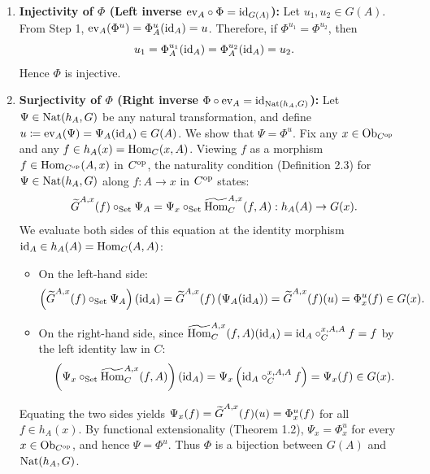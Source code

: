 \documentclass[10pt,a4paper]{article}
\begin{document}
\begin{enumerate}
\item \textbf{Injectivity of $\Phi$ (Left inverse $\mathrm{ev}_A \circ \Phi = {\textrm{id}}_{G(A)}$):}
Let $u_1, u_2 \in G(A)$. From Step 1, $\mathrm{ev}_A(\Phi^u) = \Phi^u_A({\textrm{id}}_A) = u$. Therefore, if $\Phi^{u_1} = \Phi^{u_2}$, then
$$u_1 = \Phi^{u_1}_A({\textrm{id}}_A) = \Phi^{u_2}_A({\textrm{id}}_A) = u_2.$$
Hence $\Phi$ is injective.

\item \textbf{Surjectivity of $\Phi$ (Right inverse $\Phi \circ \mathrm{ev}_A = {\textrm{id}}_{{\textrm{Nat}}(h_A,G)}$):}
Let $\Psi \in {\textrm{Nat}}(h_A, G)$ be any natural transformation, and define $u \coloneqq \mathrm{ev}_A(\Psi) = \Psi_A({\textrm{id}}_A) \in G(A)$. We show that $\Psi = \Phi^u$.
Fix any $x \in {\textrm{Ob}}_{C^{\textrm{op}}}$ and any $f \in h_A(x) = {\textrm{Hom}}_C(x,A)$. Viewing $f$ as a morphism $f \in {\textrm{Hom}}_{C^{\textrm{op}}}(A,x)$ in $C^{\textrm{op}}$, the naturality condition (Definition 2.3) for $\Psi \in {\textrm{Nat}}(h_A, G)$ along $f : A \to x$ in $C^{\textrm{op}}$ states:
$${\widetilde{G}\textrm{}}^{A,x}(f) \circ_{\textrm{Set}} \Psi_A = \Psi_x \circ_{\textrm{Set}} {\widetilde{{\textrm{Hom}}}\textrm{}}_C^{A,x}(f,A) : h_A(A) \to G(x).$$
We evaluate both sides of this equation at the identity morphism ${\textrm{id}}_A \in h_A(A) = {\textrm{Hom}}_C(A,A)$:
\begin{itemize}
\item On the left-hand side:
$$\left({\widetilde{G}\textrm{}}^{A,x}(f) \circ_{\textrm{Set}} \Psi_A\right)({\textrm{id}}_A) = {\widetilde{G}\textrm{}}^{A,x}(f)\left(\Psi_A({\textrm{id}}_A)\right) = {\widetilde{G}\textrm{}}^{A,x}(f)(u) = \Phi^u_x(f) \in G(x).$$
\item On the right-hand side, since ${\widetilde{{\textrm{Hom}}}\textrm{}}_C^{A,x}(f,A)({\textrm{id}}_A) = {\textrm{id}}_A \circ_C^{x,A,A} f = f$ by the left identity law in $C$:
$$\left(\Psi_x \circ_{\textrm{Set}} {\widetilde{{\textrm{Hom}}}\textrm{}}_C^{A,x}(f,A)\right)({\textrm{id}}_A) = \Psi_x\left({\textrm{id}}_A \circ_C^{x,A,A} f\right) = \Psi_x(f) \in G(x).$$
\end{itemize}
Equating the two sides yields $\Psi_x(f) = {\widetilde{G}\textrm{}}^{A,x}(f)(u) = \Phi^u_x(f)$ for all $f \in h_A(x)$.
By functional extensionality (Theorem 1.2), $\Psi_x = \Phi^u_x$ for every $x \in {\textrm{Ob}}_{C^{\textrm{op}}}$, and hence $\Psi = \Phi^u$. Thus $\Phi$ is a bijection between $G(A)$ and ${\textrm{Nat}}(h_A, G)$.
\end{enumerate}
\myqed
\end{document}

